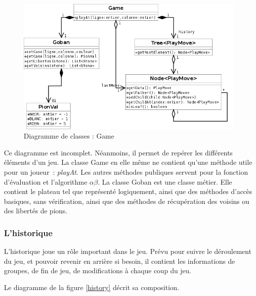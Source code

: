 \documentclass[11pt,a4paper,titlepage,french]{article}
\begin{document}
				\begin{figure}[hbt]
					\begin{center}
						\includegraphics[width=1.1\textwidth]{./classes.png}
					\end{center}
					\caption{Diagramme de classes : Game}
					\label{classes}
				\end{figure}

			Ce diagramme est incomplet. Néanmoins, il permet de repérer les différents éléments d'un jeu. La classe Game en elle même ne contient qu'une méthode utile pour un joueur~: \emph{playAt}. Les autres méthodes publiques servent pour la fonction d'évaluation et l'algorithme $\alpha\beta$. La classe Goban est une classe métier. Elle contient le plateau tel que représenté logiquement, ainsi que des méthodes d'accès basiques, sans vérification, ainsi que des méthodes de récupération des voisins ou des libertés de pions.


			\subsubsection{L'historique}

				L'historique joue un rôle important dans le jeu. Prévu pour suivre le déroulement du jeu, et pouvoir revenir en arrière si besoin, il contient les informations de groupes, de fin de jeu, de modifications à chaque coup du jeu.

				Le diagramme de la figure \ref{history} décrit sa composition.
\end{document}
